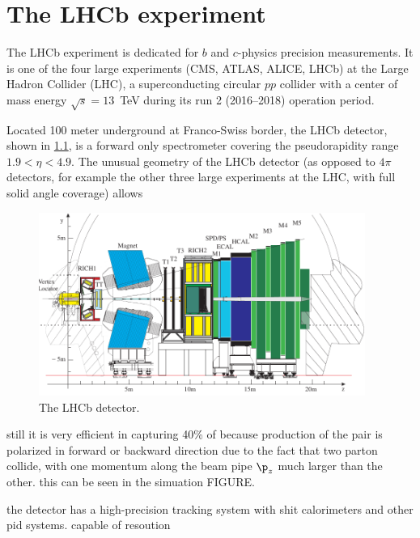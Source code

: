 \chapter{The LHCb experiment}
\label{ref:detector}

The LHCb experiment is dedicated for $b$ and $c$-physics precision measurements.
It is one of the four large experiments
(CMS, ATLAS, ALICE, LHCb) at the Large Hadron Collider (LHC),
a superconducting circular $pp$ collider with a center of mass energy
$\sqrt{s} = 13$~TeV during its run 2 (2016--2018) operation period.

Located 100 meter underground at Franco-Swiss border,
the LHCb detector,
shown in \cref{fig:lhcb-detector},
is a forward only spectrometer covering the pseudorapidity range
$1.9 < \eta < 4.9$.
The unusual geometry of the LHCb detector
(as opposed to $4\pi$ detectors,
for example the other three large experiments at the LHC,
with full solid angle coverage)
allows

\begin{figure}[htb]
    \centering
    \includegraphics[width=0.95\textwidth]{./figs-detector/lhcb_detector_view.pdf}
    \caption{The LHCb detector.}
    \label{fig:lhcb-detector}
\end{figure}

still it is very efficient in capturing 40\% of \bbbar because production
of the pair is polarized in forward or backward direction due to the fact
that two parton collide, with one momentum along the beam pipe $\p_z$ much larger
than the other.
this can be seen in the simuation FIGURE.

the detector has a high-precision tracking system with shit calorimeters and
other pid systems.
capable of resoution
